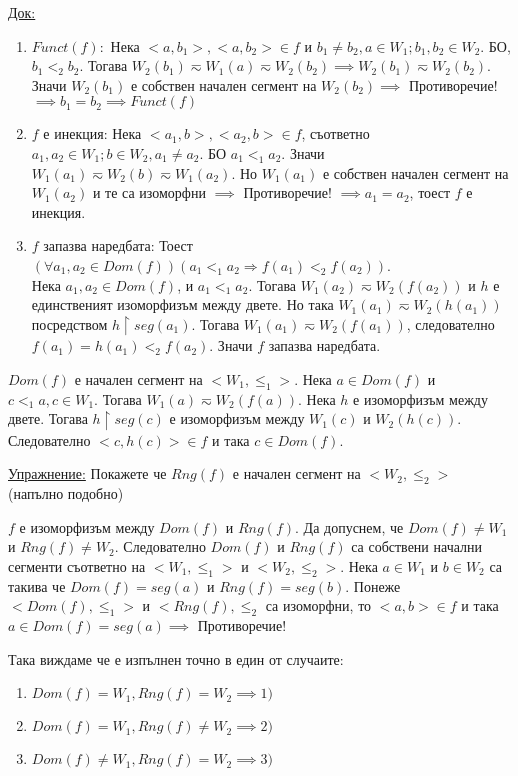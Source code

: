 \documentclass[fleqn, titlepage, 12pt]{report}
\begin{document}
\underline{Док:}
\begin{enumerate}
  \item $ Funct(f): $ Нека $ <a, b_1>, <a, b_2> \in f $ и $ b_1 \neq b_2, a \in W_1; b_1,b_2 \in W_2 $.
    БО, $ b_1 <_2 b_2 $. Тогава $ W_2(b_1) \eqsim W_1(a) \eqsim W_2(b_2) \implies W_2(b_1) \eqsim W_2(b_2)$.
    Значи $ W_2(b_1) $ е собствен начален сегмент на $ W_2(b_2) \implies $ Противоречие!
    $ \implies b_1 = b_2 \implies Funct(f)$
  \item $ f $ е инекция: Нека $ <a_1, b>, <a_2, b> \in f $, съответно $ a_1,a_2 \in W_1; b \in W_2, a_1 \neq a_2 $.
    БО $ a_1 <_1 a_2 $. Значи $ W_1(a_1) \eqsim W_2(b) \eqsim W_1(a_2) $. Но $ W_1(a_1) $ е собствен начален сегмент на
    $ W_1(a_2) $ и те са изоморфни $ \implies $ Противоречие! $ \implies a_1 = a_2 $, тоест $ f $ е инекция.
  \item $ f $ запазва наредбата: Тоест $ (\forall{a_1,a_2 \in Dom(f)})(a_1 <_1 a_2 \Rightarrow f(a_1) <_2 f(a_2)) $.\\
    Нека $ a_1, a_2 \in Dom(f) $, и $ a_1 <_1 a_2 $. Тогава $ W_1(a_2) \eqsim W_2(f(a_2))$ и $ h $ е единственият
    изоморфизъм между двете. Но така $ W_1(a_1) \eqsim W_2(h(a_1)) $ посредством $ h \upharpoonright seg(a_1)$.
    Тогава $ W_1(a_1) \eqsim W_2(f(a_1)) $, следователно $ f(a_1) = h (a_1) <_2 f(a_2) $. Значи $ f $ запазва наредбата.
\end{enumerate}

 $ Dom(f) $ е начален сегмент на $ <W_1, \leq_1> $. Нека $ a \in Dom(f) $ и $ c <_1 a, c \in W_1 $.
Тогава $ W_1(a) \eqsim W_2(f(a)) $. Нека $ h $ е изоморфизъм между двете. Тогава $ h \upharpoonright seg(c) $
е изоморфизъм между $ W_1(c) $ и $ W_2(h(c)) $. Следователно $ <c,h(c)> \in f $ и така $ c \in Dom(f) $.

\bigbreak
\underline{Упражнение:} Покажете че $ Rng(f) $ е начален сегмент на $ <W_2, \leq_2> $ (напълно подобно)
\bigbreak

$ f $ е изоморфизъм между $ Dom(f) $ и $ Rng(f) $. Да допуснем, че $ Dom(f) \neq W_1 $ и $ Rng(f) \neq W_2 $.
Следователно $ Dom(f) $ и $ Rng(f) $ са собствени начални сегменти съответно на $ <W_1, \leq_1> $ и $ <W_2, \leq_2> $.
Нека $ a \in W_1 $ и $ b \in W_2 $ са такива че $ Dom(f) = seg(a) $ и $ Rng(f) = seg(b) $.
Понеже $ <Dom(f), \leq_1> $ и $ <Rng(f), \leq_2 $ са изоморфни, то $ <a,b> \in f $
и така $ a \in Dom(f) = seg(a) \implies $ Противоречие!
\bigbreak

Така виждаме че е изпълнен точно в един от случаите:
\begin{enumerate}
  \item $ Dom(f) = W_1, Rng(f) = W_2 \implies 1) $
  \item $ Dom(f) = W_1, Rng(f) \neq W_2 \implies 2) $
  \item $ Dom(f) \neq W_1, Rng(f) = W_2 \implies 3) $
\end{enumerate}
\end{document}
